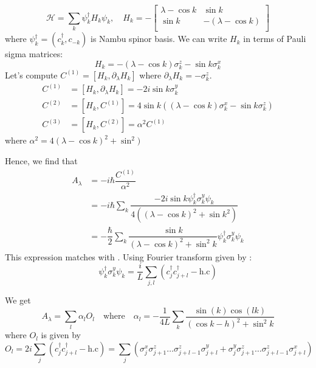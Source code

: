 \documentclass[11pt,a4paper]{article}
\begin{document}
\begin{equation}
\mathcal{H}= \sum_k \psi_k^{\dagger} H_k \psi_k , \quad H_k=-\begin{bmatrix}
     \lambda - \cos k & \sin k \\
\sin k & -(\lambda - \cos k)\\
\end{bmatrix}
\end{equation}
where $\psi_k^{\dagger}= (c^{\dagger}_k, c_{-k})$ is Nambu spinor basis. We can write $H_k$ in terms of Pauli sigma matrices:
\begin{equation}
H_k= -(\lambda - \cos k) \sigma^z_k - \sin k  \sigma^x_k
\end{equation}
Let's compute $C^{(1)}=[H_k,\partial_{\lambda} H_k] $ where $\partial_{\lambda} H_k= -\sigma^z_k$. 
\begin{align}
C^{(1)} &=[H_k,\partial_{\lambda} H_k]=- 2 i \sin k \sigma^y_k \\
C^{(2)} &=[H_k,C^{(1)}] =  4  \sin k ( (\lambda - \cos k) \sigma^x_k - \sin k \sigma^z_k) \\
C^{(3)} &=[H_k,C^{(2)}]= \alpha^2 C^{(1)} 
\end{align}
where $\alpha^2 = 4 (\lambda - \cos k)^2 + \sin ^2 ) $

Hence, we find that 
\begin{align}
A_{\lambda}& = -i \hbar \dfrac{C^{(1)}}{\alpha^2} \\
&=-i \hbar \sum_k \dfrac{- 2 i \sin k \psi_k^{\dagger} \sigma^y_k \psi_k}{4 ((\lambda - \cos k)^2 + \sin k^2) } \\
&=-  \dfrac{\hbar}{2}\sum_k \dfrac{ \sin k }{ (\lambda - \cos k)^2 +  \sin ^2 k } \psi_k^{\dagger} \sigma^y_k \psi_k
\end{align}
This expression matches with \cite{kolodrubetz2016geometry}. Using Fourier transform given by \cite{kolodrubetz2016geometry}:
\begin{equation}
 \psi_k^{\dagger} \sigma^y_k \psi_k= \dfrac{i}{L} \sum_{j,l}  (c^{\dagger}_{j} c^{\dagger}_{j+l} - \mbox{h.c})
\end{equation}

We get 
\begin{equation}
\boxed{A_{\lambda}= \sum_l \alpha_l O_l \quad \mbox{where} \quad \alpha_l= -\dfrac{1}{4 L} \sum_k \dfrac{\sin(k) \cos(lk)}{(\cos k - h)^2 + \sin^2 k}}
\end{equation}
where  $O_l$ is given by
\begin{equation}
O_l= 2 i \sum_j (c^{\dagger}_{j} c^{\dagger}_{j+l} - \mbox{h.c})= \sum_j ( \sigma_j^x \sigma_{j+1}^z \ldots \sigma_{j+l-1}^z \sigma_{j+l}^y +  \sigma_j^y \sigma_{j+1}^z \ldots \sigma_{j+l-1}^z \sigma_{j+l}^x)
\end{equation}
\end{document}
